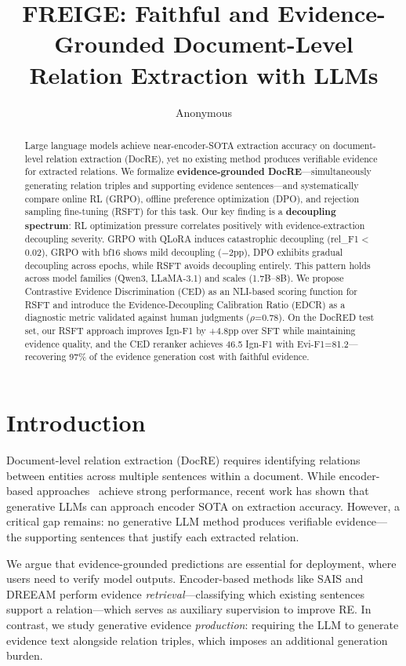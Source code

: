 \documentclass[11pt]{article}
\title{FREIGE: Faithful and Evidence-Grounded Document-Level Relation Extraction with LLMs}
\author{Anonymous}
\begin{document}
\maketitle

\begin{abstract}
Large language models achieve near-encoder-SOTA extraction accuracy on document-level relation extraction (DocRE), yet no existing method produces verifiable evidence for extracted relations. We formalize \textbf{evidence-grounded DocRE}---simultaneously generating relation triples and supporting evidence sentences---and systematically compare online RL (GRPO), offline preference optimization (DPO), and rejection sampling fine-tuning (RSFT) for this task.
Our key finding is a \textbf{decoupling spectrum}: RL optimization pressure correlates positively with evidence-extraction decoupling severity. GRPO with QLoRA induces catastrophic decoupling (rel\_F1$<$0.02), GRPO with bf16 shows mild decoupling ($-$2pp), DPO exhibits gradual decoupling across epochs, while RSFT avoids decoupling entirely. This pattern holds across model families (Qwen3, LLaMA-3.1) and scales (1.7B--8B).
We propose Contrastive Evidence Discrimination (CED) as an NLI-based scoring function for RSFT and introduce the Evidence-Decoupling Calibration Ratio (EDCR) as a diagnostic metric validated against human judgments ($\rho$=0.78). On the DocRED test set, our RSFT approach improves Ign-F1 by +4.8pp over SFT while maintaining evidence quality, and the CED reranker achieves 46.5 Ign-F1 with Evi-F1=81.2---recovering 97\% of the evidence generation cost with faithful evidence.
\end{abstract}

\section{Introduction}

Document-level relation extraction (DocRE) requires identifying relations between entities across multiple sentences within a document. While encoder-based approaches~\cite{tan2022dreeam,xu2022sais} achieve strong performance, recent work has shown that generative LLMs can approach encoder SOTA on extraction accuracy. However, a critical gap remains: no generative LLM method produces verifiable evidence---the supporting sentences that justify each extracted relation.

We argue that evidence-grounded predictions are essential for deployment, where users need to verify model outputs. Encoder-based methods like SAIS and DREEAM perform evidence \emph{retrieval}---classifying which existing sentences support a relation---which serves as auxiliary supervision to improve RE. In contrast, we study generative evidence \emph{production}: requiring the LLM to generate evidence text alongside relation triples, which imposes an additional generation burden.
\end{document}
